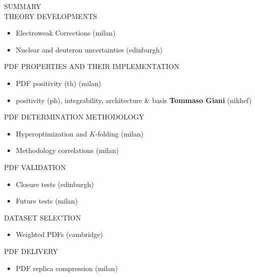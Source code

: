 \documentclass[a4,landscape]{seminar}
\newcommand{\1}{1\!\!\!1}
\begin{document}
\renewcommand{\slidestretch}{.7}
\begin{slide}{\small
\begin{center}{\large\darkgreen SUMMARY}\\
{\blue THEORY DEVELOPMENTS}
\end{center}
\begin{itemize}
\item  Electroweak Corrections    (milan)
\item Nuclear and deuteron uncertainties  (edinburgh)
\end{itemize}
\begin{center}
{\blue PDF PROPERTIES AND THEIR IMPLEMENTATION}
\end{center}
\begin{itemize}
\item PDF positivity (th)  (milan)
\item  positivity (ph), integrability, architecture \& basis
  {\bf Tommaso Giani} {\small (nikhef)}
\end{itemize}
\begin{center}
{\blue  PDF DETERMINATION METHODOLOGY}
\end{center}
\begin{itemize}
\item Hyperoptimization and $K$-folding  (milan)    
\item Methodology correlations  (milan)
\end{itemize}
\begin{center}
{\blue  PDF VALIDATION}
\end{center}
\begin{itemize}
\item Closure tests (edinburgh)
\item Future tests  (milan)    
\end{itemize}
\begin{center}
{\blue  DATASET SELECTION}
\end{center}
\begin{itemize}
\item Weighted PDFs (cambridge)
\end{itemize}
\begin{center}
{\blue  PDF DELIVERY}
\end{center}
\begin{itemize}
\item PDF replica compression (milan)
\end{itemize}


  }


\end{slide}
\end{document}
